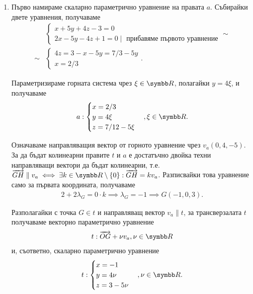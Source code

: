 \documentclass[numbers=endperiod, bibliography=totocnumbered]{scrartcl}
\begin{document}
\begin{solution}
\begin{enumerate}[label=\alph*)]
    \item Първо намираме скаларно параметрично уравнение на правата \( a \). Събирайки двете уравнения, получаваме
    \begin{align*}
      &\begin{cases}
        x + 5y + 4z - 3 = 0 \\
        2x - 5y - 4z + 1 = 0 \mid \text{ прибавяме първото уравнение}
      \end{cases}
      \sim \\ \sim
      &\begin{cases}
        4z = 3 - x - 5y = 7 / 3 - 5y \\
        x = 2 / 3
      \end{cases}.
    \end{align*}

    Параметризираме горната система чрез \( \xi \in \R \), полагайки \( y = 4\xi \), и получаваме
    \begin{align*}
      a: \begin{cases}
        x = 2 / 3 \\
        y = 4\xi \\
        z = 7/{12} - 5\xi
      \end{cases},
      \xi \in \R.
    \end{align*}

    Означаваме направляващия вектор от горното уравнение чрез \( v_a(0, 4, -5) \). За да бъдат колинеарни правите \( t \) и \( a \) е достатъчно двойка техни направляващи вектори да бъдат колинеарни, т.е. \( \V{GH} \parallel v_a \iff \exists k \in \R \setminus \{ 0 \} : \V{GH} = k v_a \). Разписвайки това уравнение само за първата координата, получаваме
    \begin{align*}
      2 + 2\lambda_G = 0 \cdot k \implies \lambda_G = -1 \implies G(-1, 0, 3).
    \end{align*}

    Разполагайки с точка \( G \in t \) и направляващ вектор \( v_a \parallel t \), за трансверзалата \( t \) получаваме векторно параметрично уравнение
    \begin{align*}
      t: \V{OG} + \nu v_a, \nu \in \R
    \end{align*}
    и, съответно, скаларно параметрично уравнение
    \begin{align*}
      t: \begin{cases}
        x = -1 \\
        y = 4\nu \\
        z = 3 - 5\nu
      \end{cases},
      \nu \in \R.
    \end{align*}
  \end{enumerate}
\end{solution}
\end{document}
